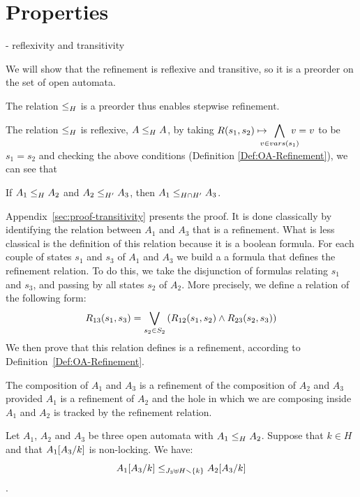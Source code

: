 \documentclass[runningheads]{llncs}
\begin{document}
\section{Properties}\label{sec:prop}


- reflexivity and transitivity

We will  show  that  the  refinement  is  reflexive  and  transitive,  so  it  is  a  preorder on the set of open automata.

\begin{lemma} The relation \(\wrel{}{}{H}\) is a preorder thus enables stepwise refinement.
\end{lemma}
The relation  \(\wrel{}{}{H}\) is reflexive,  \(\wrel{A}{A}{H}\),  by taking $R\mpar{s_1, s_2} \mapsto \displaystyle\bigwedge_\subbox{v \in vars(s_1)} {v=v}$ to be $s_1= s_2$  and checking the above conditions (Definition \ref{Def:OA-Refinement}), we can see that \\


\begin{theorem}[Transitivity]
If $\wrel{A_1}{A_2}{H}$ and $\wrel{A_2}{A_3}{H'}$, then $\wrel{A_1}{A_3}{H\cap H'}$.
\end{theorem}

Appendix~\ref{sec:proof-transitivity} presents the proof. It is done classically by identifying the relation between $A_1$ and $A_3$ that is a refinement. What is less classical is the definition of this relation because it is a boolean formula. For each couple of states  $s_1$ and $s_3$ of $A_1$ and $A_3$ we build a a formula that defines the refinement relation. To do this, we take the disjunction of formulas relating $s_1$ and $s_3$, and passing by all states $s_2$ of $A_2$. More precisely, we define a relation of the following form:
  \[R_{13}(s_1,s_3)=\bigvee_{s_2\in S_2}\mpar{R_{12}(s_1,s_2) \land R_{23}(s_2,s_3) } \]
We then prove that this relation defines is a refinement, according to Definition~\ref{Def:OA-Refinement}.




The composition of $A_1$ and $A_3$ is a refinement of the composition of $A_2$ and $A_3$ provided $A_1$ is a refinement of $A_2$ and the hole in which we are composing inside $A_1$ and $A_2$ is tracked by the refinement relation.

\begin{theorem}
Let $A_1$, $A_2$ and $A_3$ be three open automata with $\wrel{A_1}{A_2}{H}$. 
Suppose that \(k \in H\) and that \(A_1\subst{A_3}{k}\) is non-locking.
We have: \[\wrel{A_1\subst{A_3}{k}}{A_2\subst{A_3}{k}}{J_3 \uplus H \setminus \mbrc{k}}\].
\end{theorem}
\end{document}

